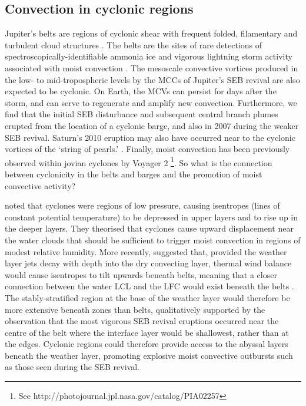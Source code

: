 \documentclass[final,authoryear,5p,times,twocolumn]{elsarticle}
\begin{document}
\subsection{Convection in cyclonic regions}
\label{cyclone}
Jupiter's belts are regions of cyclonic shear with frequent folded, filamentary and turbulent cloud structures \citep{95rogers, 04ingersoll}.  The belts are the sites of rare detections of spectroscopically-identifiable ammonia ice \citep{02baines} and vigorous lightning storm activity associated with moist convection \citep{92borucki, 99little, 00gierasch, 03porco}.  The mesoscale convective vortices produced in the low- to mid-tropospheric levels by the MCCs of Jupiter's SEB revival are also expected to be cyclonic.  On Earth, the MCVs can persist for days after the storm, and can serve to regenerate and amplify new convection.  Furthermore, we find that the initial SEB disturbance and subsequent central branch plumes erupted from the location of a cyclonic barge, and also in 2007 during the weaker SEB revival.  Saturn's 2010 eruption may also have occurred near to the cyclonic vortices of the `string of pearls.' \citep{14sayanagi}.  Finally, moist convection has been previously observed within jovian cyclones by Voyager 2 \citep{79smith, 15thomson_phd}\footnote{See \mbox{http://photojournal.jpl.nasa.gov/catalog/PIA02257}}.  So what is the connection between cyclonicity in the belts and barges and the promotion of moist convective activity?

\citet{89dowling_dps} noted that cyclones were regions of low pressure, causing isentropes (lines of constant potential temperature) to be depressed in upper layers and to rise up in the deeper layers.  They theorised that cyclones cause upward displacement near the water clouds that should be sufficient to trigger moist convection in regions of modest relative humidity.  More recently, \citet{16thomson} suggested that, provided the weather layer jets decay with depth into the dry convecting layer, thermal wind balance would cause isentropes to tilt upwards beneath belts, meaning that a closer connection between the water LCL and the LFC would exist beneath the belts \citep[see Fig. 1 of][and Fig. \ref{convection}]{16thomson}.  The stably-stratified region at the base of the weather layer would therefore be more extensive beneath zones than belts, qualitatively supported by the observation that the most vigorous SEB revival eruptions occurred near the centre of the belt where the interface layer would be shallowest, rather than at the edges.  Cyclonic regions could therefore provide access to the abyssal layers beneath the weather layer, promoting explosive moist convective outbursts such as those seen during the SEB revival.
\end{document}
